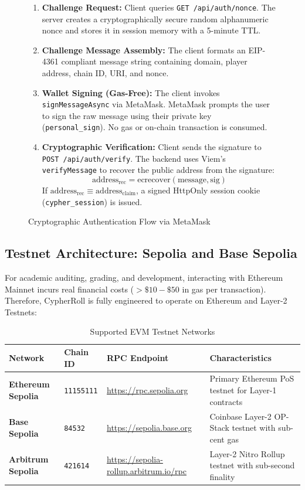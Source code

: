 \begin{figure}[h!]
\centering
\begin{tcolorbox}[colback=gray!5,colframe=blue!70!black,title=\textbf{Protocol 5.1: Cryptographic SIWE Authentication Handshake}]
\begin{enumerate}[leftmargin=1.5em]
    \item \textbf{Challenge Request:} Client queries \texttt{GET /api/auth/nonce}. The server creates a cryptographically secure random alphanumeric nonce and stores it in session memory with a 5-minute TTL.
    \item \textbf{Challenge Message Assembly:} The client formats an EIP-4361 compliant message string containing domain, player address, chain ID, URI, and nonce.
    \item \textbf{Wallet Signing (Gas-Free):} The client invokes \texttt{signMessageAsync} via MetaMask. MetaMask prompts the user to sign the raw message using their private key (\texttt{personal\_sign}). No gas or on-chain transaction is consumed.
    \item \textbf{Cryptographic Verification:} Client sends the signature to \texttt{POST /api/auth/verify}. The backend uses Viem's \texttt{verifyMessage} to recover the public address from the signature:
    $$\text{address}_{\text{rec}} = \text{ecrecover}(\text{message}, \text{sig})$$
    If $\text{address}_{\text{rec}} \equiv \text{address}_{\text{claim}}$, a signed HttpOnly session cookie (\texttt{cypher\_session}) is issued.
\end{enumerate}
\end{tcolorbox}
\caption{Cryptographic Authentication Flow via MetaMask}
\end{figure}

\subsection{Testnet Architecture: Sepolia and Base Sepolia}
For academic auditing, grading, and development, interacting with Ethereum Mainnet incurs real financial costs ($>\$10-\$50$ in gas per transaction). Therefore, CypherRoll is fully engineered to operate on Ethereum and Layer-2 Testnets:

\begin{table}[h!]
\centering
\renewcommand{\arraystretch}{1.25}
\begin{tabularx}{\textwidth}{@{} l l l X @{}}
\toprule
\textbf{Network} & \textbf{Chain ID} & \textbf{RPC Endpoint} & \textbf{Characteristics} \\
\midrule
\textbf{Ethereum Sepolia} & \texttt{11155111} & \url{https://rpc.sepolia.org} & Primary Ethereum PoS testnet for Layer-1 contracts \\
\textbf{Base Sepolia} & \texttt{84532} & \url{https://sepolia.base.org} & Coinbase Layer-2 OP-Stack testnet with sub-cent gas \\
\textbf{Arbitrum Sepolia} & \texttt{421614} & \url{https://sepolia-rollup.arbitrum.io/rpc} & Layer-2 Nitro Rollup testnet with sub-second finality \\
\bottomrule
\end{tabularx}
\caption{Supported EVM Testnet Networks}
\end{table}

